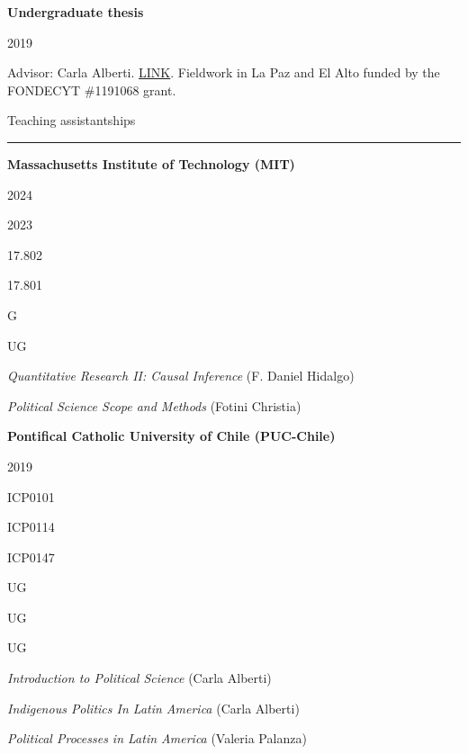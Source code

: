 \documentclass[a4paper, 12pt]{article}
\begin{document}
\textbf{Undergraduate thesis}

\begin{multicols}{2}

2019

\columnbreak

 Advisor: Carla Alberti. \href{https://ssrn.com/abstract=3866860}{LINK}. Fieldwork in La Paz and El Alto funded by the FONDECYT \#1191068 grant.

\end{multicols}




\newpage
\large Teaching assistantships
\smallskip
\hrule
\normalsize


\bigskip
\textbf{Massachusetts Institute of Technology (MIT)}

\begin{multicols}{4}

2024

2023

\columnbreak

17.802

17.801

\columnbreak

G

UG

\columnbreak

\textit{Quantitative Research II: Causal Inference} (F. Daniel Hidalgo)

\textit{Political Science Scope and Methods} (Fotini Christia)

\end{multicols}


\textbf{Pontifical Catholic University of Chile (PUC-Chile)}


\begin{multicols}{4}

2019

\columnbreak

ICP0101

ICP0114

ICP0147

\columnbreak

UG

UG

UG

\columnbreak

\textit{Introduction to Political Science} (Carla Alberti)

\textit{Indigenous Politics In Latin America} (Carla Alberti)

\textit{Political Processes in Latin America} (Valeria Palanza)

\end{multicols}
\end{document}
